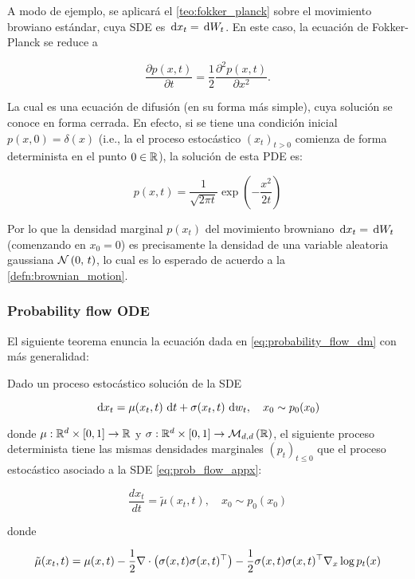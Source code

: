 A modo de ejemplo, se aplicará el \autoref{teo:fokker_planck} sobre el movimiento browiano estándar, cuya SDE es $\,\operatorname{d}\! x_{t}= \,\operatorname{d}\! W_t$. En este caso, la ecuación de Fokker-Planck se reduce a

\begin{equation*}
    \frac{\partial p(x,t)}{\partial t} = \frac{1}{2} \frac{\partial^{2}p(x, t)}{\partial x^2}.
\end{equation*}

La cual es una ecuación de difusión (en su forma más simple), cuya solución se conoce en forma cerrada. En efecto, si se tiene una condición inicial $p(x,0)=\delta(x)$ (i.e., la el proceso estocástico $(x_t)_{t>0}$ comienza de forma determinista en el punto $0\in\mathbb{R}$), la solución de esta PDE es:

\begin{equation*}
    p(x,t) = \frac{1}{\sqrt{2\pi t}} \exp\left(-\frac{x^2}{2t}\right)
\end{equation*}

Por lo que la densidad marginal $p(x_t)$ del movimiento browniano $\,\operatorname{d}\! x_{t}= \,\operatorname{d}\! W_t$ (comenzando en $x_0=0$) es precisamente la densidad de una variable aleatoria gaussiana $\mathcal{N}\left(0,\,t\right)$, lo cual es lo esperado de acuerdo a la \autoref{defn:brownian_motion}.

\subsubsection{Probability flow ODE}

El siguiente teorema enuncia la ecuación dada en \autoref{eq:probability_flow_dm} con más generalidad:

\begin{teo}
    \label{teo:probability_flow}

    Dado un proceso estocástico solución de la SDE

    \begin{equation*}
        \label{eq:prob_flow_appx}
        \,\operatorname{d}\! x_t = \mu(x_t,t)\,\operatorname{d}\! t + \sigma(x_t,t)\,\operatorname{d}\! w_t,
        \quad x_0\sim p_0(x_0)
    \end{equation*}

    donde $\mu:\mathbb{R}^d\times[0,1]\to\mathbb{R}$ y $\sigma:\mathbb{R}^d\times[0,1]\to\mathcal{M}_{d,d}\left(\mathbb{R}\right)$, el siguiente proceso determinista tiene las mismas densidades marginales $(p_t)_{t\leq 0}$ que el proceso estocástico asociado a la SDE \eqref{eq:prob_flow_appx}:

    \begin{equation*}
        \frac{dx_t}{dt} = \tilde{\mu}(x_t,t),
        \quad x_0\sim p_0(x_0)
    \end{equation*}

    donde

    \begin{equation*}
        \tilde{\mu}(x_t,t) = \mu(x,t) - \frac{1}{2}\nabla\cdot\left(\sigma(x,t)\sigma(x,t)^\top\right) - \frac{1}{2} \sigma(x,t)\sigma(x,t)^\top \nabla_{x} \log p_t(x)
    \end{equation*}

\end{teo}

